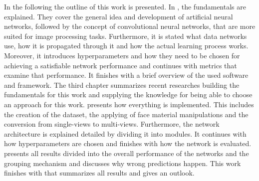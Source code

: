 In the following the outline of this work is presented.
In , the fundamentals are explained.
They cover the general idea and development of artificial neural networks, followed by the concept of convolutional neural networks, that are more suited for image processing tasks.
Furthermore, it is stated what data networks use, how it is propagated through it and how the actual learning process works.
Moreover, it introduces hyperparameters and how they need to be chosen for achieving a satisfiable network performance and continues with metrics that examine that performance.
It finishes with a brief overview of the used software and framework.
The third chapter  summarizes recent researches building the fundamentals for this work and supplying the knowledge for being able to choose an approach for this work.
 presents how everything is implemented.
This includes the creation of the dataset, the applying of face material manipulations and the conversion from single-views to multi-views.
Furthermore, the network architecture is explained detailed by dividing it into modules.
It continues with how hyperparameters are chosen and finishes with how the network is evaluated.
 presents all results divided into the overall performance of the networks and the grouping mechanism and discusses why wrong predictions happen.
This work finishes with  that summarizes all results and gives an outlook.